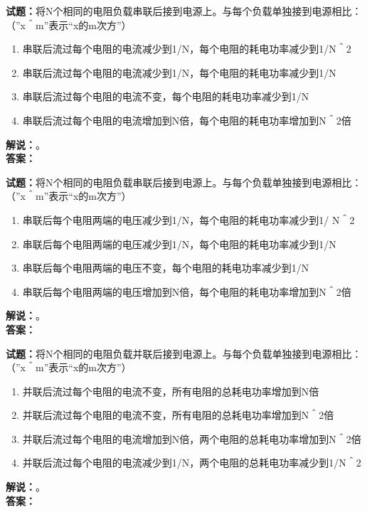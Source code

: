 \documentclass{ctexbook}
\begin{document}
\bigskip

\noindent\textbf{试题：}将N个相同的电阻负载串联后接到电源上。与每个负载单独接到电源相比：（”x＾m”表示“x的m次方”）
\begin{enumerate}[leftmargin=3em]
  \item 串联后流过每个电阻的电流减少到1/N，每个电阻的耗电功率减少到1/N＾2
  \item 串联后流过每个电阻的电流减少到1/N，每个电阻的耗电功率减少到1/N
  \item 串联后流过每个电阻的电流不变，每个电阻的耗电功率减少到1/N
  \item 串联后流过每个电阻的电流增加到N倍，每个电阻的耗电功率增加到N＾2倍
\end{enumerate}
\noindent\textbf{解说：}\textbf{}。\\\noindent\textbf{答案：}

\bigskip

\noindent\textbf{试题：}将N个相同的电阻负载串联后接到电源上。与每个负载单独接到电源相比：（”x＾m”表示“x的m次方”）
\begin{enumerate}[leftmargin=3em]
  \item 串联后每个电阻两端的电压减少到1/N，每个电阻的耗电功率减少到1/ N＾2
  \item 串联后每个电阻两端的电压减少到1/N，每个电阻的耗电功率减少到1/N
  \item 串联后每个电阻两端的电压不变，每个电阻的耗电功率减少到1/N
  \item 串联后每个电阻两端的电压增加到N倍，每个电阻的耗电功率增加到N＾2倍
\end{enumerate}
\noindent\textbf{解说：}\textbf{}。\\\noindent\textbf{答案：}

\bigskip

\noindent\textbf{试题：}将N个相同的电阻负载并联后接到电源上。与每个负载单独接到电源相比：（”x＾m”表示“x的m次方”）
\begin{enumerate}[leftmargin=3em]
  \item 并联后流过每个电阻的电流不变，所有电阻的总耗电功率增加到N倍
  \item 并联后流过每个电阻的电流不变，所有电阻的总耗电功率增加到N＾2倍
  \item 并联后流过每个电阻的电流增加到N倍，两个电阻的总耗电功率增加到N＾2倍
  \item 并联后流过每个电阻的电流减少到1/N，两个电阻的总耗电功率减少到1/N＾2
\end{enumerate}
\noindent\textbf{解说：}\textbf{}。\\\noindent\textbf{答案：}
\end{document}
